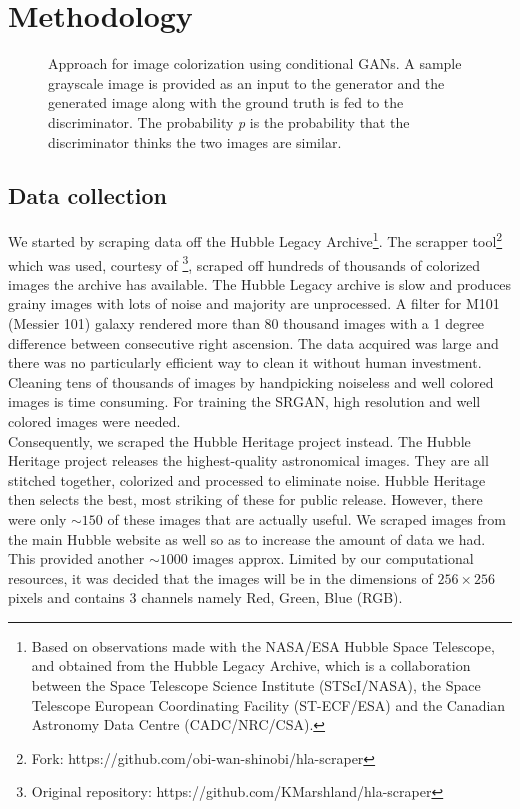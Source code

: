 \documentclass{article} %
\begin{document}
\section{Methodology}
\begin{figure}[!htb]
        \centering
        \resizebox{\textwidth}{!}{
        }
        \caption{Approach for image colorization using conditional GANs. A sample grayscale image is provided as an input to the generator and the generated image along with the ground truth is fed to the discriminator. The probability \textit{p} is the probability that the discriminator thinks the two images are similar.}
        \label{fig:gan_visualization}
    \end{figure}
\subsection{Data collection}
    \hspace*{0.167 in}We started by scraping data off the Hubble Legacy Archive\footnote{Based on observations made with the NASA/ESA Hubble Space Telescope, and obtained from the Hubble Legacy Archive, which is a collaboration between the Space Telescope Science Institute (STScI/NASA), the Space Telescope European Coordinating Facility (ST-ECF/ESA) and the Canadian Astronomy Data Centre (CADC/NRC/CSA).}. The scrapper tool\footnote{Fork: https://github.com/obi-wan-shinobi/hla-scraper} which was used, courtesy of \cite{Gao2019astronomical}\footnote{Original repository: https://github.com/KMarshland/hla-scraper}, scraped off hundreds of thousands of colorized images the archive has available. The Hubble Legacy archive is slow and produces grainy images with lots of noise and majority are unprocessed. A filter for M101 (Messier 101) galaxy rendered more than 80 thousand images with a 1 degree difference between consecutive right ascension. The data acquired was large and there was no particularly efficient way to clean it without human investment. Cleaning tens of thousands of images by handpicking noiseless and well colored images is time consuming. For training the SRGAN, high resolution and well colored images were needed.\\
    \hspace*{0.167 in}Consequently, we scraped the Hubble Heritage project instead. The Hubble Heritage project releases the highest-quality astronomical images. They are all stitched together, colorized and processed to eliminate noise. Hubble Heritage then selects the best, most striking of these for public release. However, there were only $\sim150$ of these images that are actually useful. We scraped images from the main Hubble website as well so as to increase the amount of data we had. This provided another $\sim1000$ images approx. Limited by our computational resources, it was decided that the images will be in the dimensions of $256\times 256$ pixels and contains 3 channels namely Red, Green, Blue (RGB).\\
    
\end{document}
